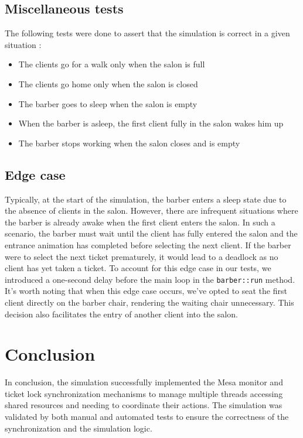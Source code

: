 \documentclass{article}
\begin{document}
    \subsection{Miscellaneous tests}
    The following tests were done to assert that the simulation is correct in a given situation :
    \begin{itemize}
        \item The clients go for a walk only when the salon is full
        \item The clients go home only when the salon is closed
        \item The barber goes to sleep when the salon is empty
        \item When the barber is asleep, the first client fully in the salon wakes him up
        \item The barber stops working when the salon closes and is empty
    \end{itemize}

    \subsection{Edge case}
    Typically, at the start of the simulation, the barber enters a sleep state due to the absence of clients in the salon.
    However, there are infrequent situations where the barber is already awake when the first client enters the salon.
    In such a scenario, the barber must wait until the client has fully entered the salon and the entrance animation has completed before selecting the next client.
    If the barber were to select the next ticket prematurely, it would lead to a deadlock as no client has yet taken a ticket.
    To account for this edge case in our tests, we introduced a one-second delay before the main loop in the \texttt{barber::run} method.
    It's worth noting that when this edge case occurs, we've opted to seat the first client directly on the barber chair, rendering the waiting chair unnecessary.
    This decision also facilitates the entry of another client into the salon.

    \section{Conclusion}
    In conclusion, the simulation successfully implemented the Mesa monitor and ticket lock synchronization mechanisms to manage multiple threads accessing shared resources and needing to coordinate their actions.
    The simulation was validated by both manual and automated tests to ensure the correctness of the synchronization and the simulation logic.
\end{document}
